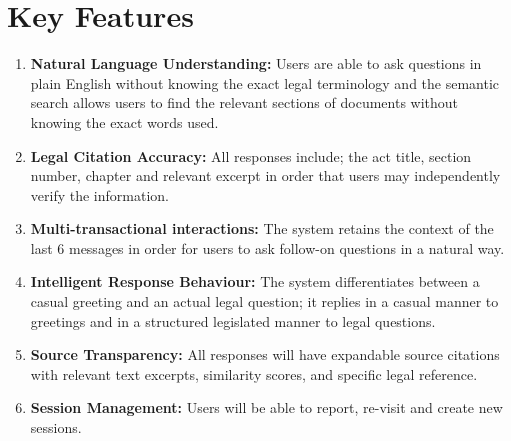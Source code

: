 \documentclass[12pt,a4paper]{article}
\begin{document}
\section{Key Features}

\begin{enumerate}
  \item \textbf{Natural Language Understanding:} Users are able to ask questions in plain English without knowing the exact legal terminology and the semantic search allows users to find the relevant sections of documents without knowing the exact words used.
  \item \textbf{Legal Citation Accuracy:} All responses include; the act title, section number, chapter and relevant excerpt in order that users may independently verify the information.
  \item \textbf{Multi-transactional interactions:} The system retains the context of the last 6 messages in order for users to ask follow-on questions in a natural way.
  \item \textbf{Intelligent Response Behaviour:} The system differentiates between a casual greeting and an actual legal question; it replies in a casual manner to greetings and in a structured legislated manner to legal questions.
  \item \textbf{Source Transparency:} All responses will have expandable source citations with relevant text excerpts, similarity scores, and specific legal reference.
  \item \textbf{Session Management:} Users will be able to report, re-visit and create new sessions.


\end{enumerate}
\end{document}
